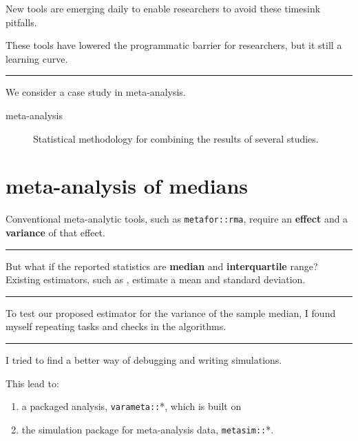 \documentclass[article,30pt,extrafontsizes]{memoir}
\begin{document}
\begin{adjmulticols*}{3}{0.5in}{0.5in}
{New tools\autocite{wickham_tidyverse:_2017} are emerging daily to enable
researchers to avoid these timesink pitfalls.

These tools have lowered the programmatic barrier for researchers, but
it still a learning curve.

\begin{center}\rule{0.5\linewidth}{\linethickness}\end{center}

We consider a case study in meta-analysis.

\begin{description}
\item[meta-analysis] Statistical methodology for combining the results of several studies. 

\end{description}

\hypertarget{meta-analysis-of-medians}{%
\section{meta-analysis of medians}\label{meta-analysis-of-medians}}

Conventional meta-analytic tools, such as
\texttt{metafor::rma}\autocite{viechtbauer_conducting_2010}, require an
\textbf{effect} and a \textbf{variance} of that effect.

\begin{center}\rule{0.5\linewidth}{\linethickness}\end{center}

But what if the reported statistics are \textbf{median} and
\textbf{interquartile} range? Existing estimators, such as
\autocite{wan_estimating_2014}, estimate a mean and standard deviation.

\begin{center}\rule{0.5\linewidth}{\linethickness}\end{center}

To test our proposed estimator for the variance of the sample median, I
found myself repeating tasks and checks in the algorithms.

\begin{center}\rule{0.5\linewidth}{\linethickness}\end{center}

I tried to find a better way of debugging and writing simulations.

This lead to:

\begin{enumerate}
\def\labelenumi{\arabic{enumi}.}
\tightlist
\item
  a packaged analysis\autocite{marwick_packaging_2018},
  \texttt{varameta::}*, which is built on
\item
  the simulation package for meta-analysis data, \texttt{metasim::}*.
\end{enumerate}

}
\end{adjmulticols*}
\end{document}
